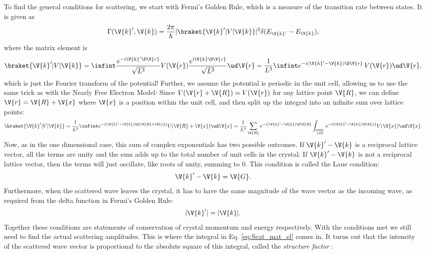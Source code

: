 \documentclass[main.tex]{subfiles}
\begin{document}
	To find the general conditions for scattering, we start with Fermi's Golden Rule, which is a measure of the transition rate between states. It is given as
	\begin{equation}\label{eq:Scat_fermi}
		\Gamma(\V{k}', \V{k}) = \frac{2\pi}{\hbar}|\braket{\V{k}' | V | \V{k}}|^2 \delta(E_{\V{k}'}-E_{\V{k}}),
	\end{equation}
	where the matrix element is
	\begin{equation}\label{eq:Scat_mat_el_initial}
		\braket{\V{k}' | V | \V{k}} = \infint \frac{e^{-i \V{k}'\D\V{r}}}{\sqrt{L^3}} V(\V{r}) \frac{e^{i \V{k}\D\V{r}}}{\sqrt{L^3}} \ud \V{r} = \frac{1}{L^3} \infint e^{-i(\V{k}'-\V{k}) \D \V{r}} \, V(\V{r}) \ud \V{r},
	\end{equation}
	which is just the Fourier transform of the potential! Further, we assume the potential is periodic in the unit cell, allowing us to use the same trick as with the Nearly Free Electron Model: Since $ V(\V{r} + \V{R}) =  V(\V{r}) $ for any lattice point $ \V{R} $, we can define $ \V{r} = \V{R} + \V{x} $ where $ \V{x} $ is a position within the unit cell, and then split up the integral into an infinite sum over lattice points:
	\begin{equation}\label{eq:Scat_mat_el}
		\braket{\V{k}' | V | \V{k}} = \frac{1}{L^3}\infint e^{-i(\V{k}'-\V{k})\D(\V{R}+\V{x})} V(\V{R}+ \V{x}) \ud \V{x} = \frac{1}{L^3} \sum_{\V{R}} e^{-i(\V{k}'-\V{k}) \D \V{R}}\int_{\substack{\text{unit-} \\\text{cell}}} e^{-i (\V{k}'-\V{k}) \D \V{x}} V(\V{x}) \ud \V{x}.
	\end{equation}
	Now, as in the one dimensional case, this sum of complex exponentials has two possible outcomes. If $ \V{k}'-\V{k} $ is a reciprocal lattice vector, all the terms are unity and the sum adds up to the total number of unit cells in the crystal. If $ \V{k}'-\V{k} $ is not a reciprocal lattice vector, then the terms will just oscillate, like roots of unity, summing to 0. This condition is called the Laue condition:
	\begin{equation}\label{eq:Scat_Laue}
		\V{k}' - \V{k} =  \V{G}.
	\end{equation}
	Furthermore, when the scattered wave leaves the crystal, it has to have the same magnitude of the wave vector as the incoming wave, as required from the delta function in Fermi's Golden Rule:
	\begin{equation}\label{eq:Scat_E_cons}
		|\V{k}'| = |\V{k}|.
	\end{equation}
	Together these conditions are statements of conservation of crystal momentum and energy respectively. With the conditions met we still need to find the actual scattering amplitudes. This is where the integral in Eq. \eqref{eq:Scat_mat_el} comes in. It turns out that the intensity of the scattered wave vector is proportional to the absolute square of this integral, called the \textit{structure factor} \cite{simon}:
\end{document}

